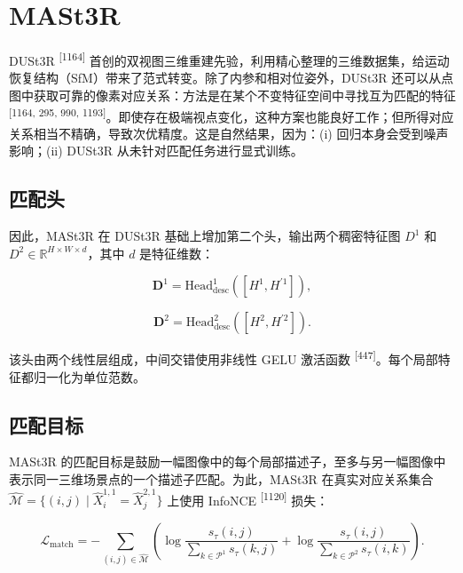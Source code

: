 \section{MASt3R}

DUSt3R \textsuperscript{[1164]} 首创的双视图三维重建先验，利用精心整理的三维数据集，给运动恢复结构（SfM）带来了范式转变。除了内参和相对位姿外，DUSt3R 还可以从点图中获取可靠的像素对应关系：方法是在某个不变特征空间中寻找互为匹配的特征 \textsuperscript{[1164, 295, 990, 1193]}。即使存在极端视点变化，这种方案也能良好工作；但所得对应关系相当不精确，导致次优精度。这是自然结果，因为：(i) 回归本身会受到噪声影响；(ii) DUSt3R 从未针对匹配任务进行显式训练。

\subsection{匹配头}

因此，MASt3R 在 DUSt3R 基础上增加第二个头，输出两个稠密特征图 $D^1$ 和 $D^2\in\mathbb{R}^{H\times W\times d}$，其中 $d$ 是特征维数：

\begin{equation}
\boldsymbol {D} ^ {1} = \mathrm{Head} _ {\mathrm{desc}} ^ {1} ([ H ^ {1}, H ^ {\prime 1} ]),\tag{13.19}
\end{equation}

\begin{equation}
\pmb {D} ^ {2} = \mathrm{Head} _ {\mathrm{desc}} ^ {2} ([ H ^ {2}, H ^ {\prime 2} ]).\tag{13.20}
\end{equation}

该头由两个线性层组成，中间交错使用非线性 GELU 激活函数 \textsuperscript{[447]}。每个局部特征都归一化为单位范数。

\subsection{匹配目标}

MASt3R 的匹配目标是鼓励一幅图像中的每个局部描述子，至多与另一幅图像中表示同一三维场景点的一个描述子匹配。为此，MASt3R 在真实对应关系集合 $\hat{\mathcal{M}}=\{(i,j)\mid\hat X_i^{1,1}=\hat X_j^{2,1}\}$ 上使用 InfoNCE \textsuperscript{[1120]} 损失：

\begin{equation}
\mathcal {L} _ {\mathrm{match}} = - \sum_ {(i, j) \in \hat {\mathcal {M}}} \left(\log \frac {s _ {\tau} (i , j)}{\sum _ {k \in \mathcal {P} ^ {1}} s _ {\tau} (k , j)} + \log \frac {s _ {\tau} (i , j)}{\sum _ {k \in \mathcal {P} ^ {2}} s _ {\tau} (i , k)}\right).\tag{13.21}
\end{equation}

